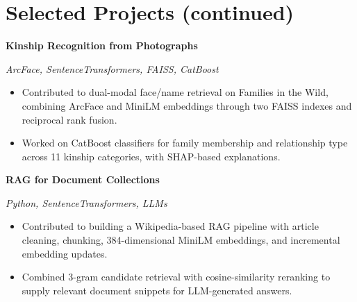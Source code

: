 \documentclass[11pt]{article}
\newcommand{\project}[2]{\textbf{#1}\par{\small\textit{#2}}\par}
\begin{document}
\section{Selected Projects (continued)}
\project{Kinship Recognition from Photographs}{ArcFace, SentenceTransformers, FAISS, CatBoost}
\begin{itemize}
    \item Contributed to dual-modal face/name retrieval on Families in the Wild, combining ArcFace and MiniLM embeddings through two FAISS indexes and reciprocal rank fusion.
    \item Worked on CatBoost classifiers for family membership and relationship type across 11 kinship categories, with SHAP-based explanations.
\end{itemize}
\vspace{6pt}
\project{RAG for Document Collections}{Python, SentenceTransformers, LLMs}
\begin{itemize}
    \item Contributed to building a Wikipedia-based RAG pipeline with article cleaning, chunking, 384-dimensional MiniLM embeddings, and incremental embedding updates.
    \item Combined 3-gram candidate retrieval with cosine-similarity reranking to supply relevant document snippets for LLM-generated answers.
\end{itemize}
\end{document}
